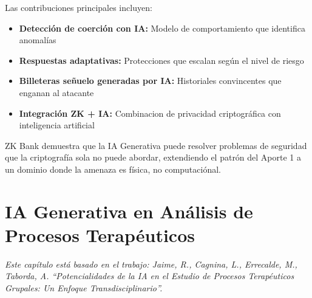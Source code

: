\documentclass[12pt,a4paper,twoside]{book}
\begin{document}
Las contribuciones principales incluyen:

\begin{itemize}
    \item \textbf{Detección de coerción con IA:} Modelo de comportamiento que identifica anomalías
    \item \textbf{Respuestas adaptativas:} Protecciones que escalan según el nivel de riesgo
    \item \textbf{Billeteras señuelo generadas por IA:} Historiales convincentes que enganan al atacante
    \item \textbf{Integración ZK + IA:} Combinacion de privacidad criptográfica con inteligencia artificial
\end{itemize}

ZK Bank demuestra que la IA Generativa puede resolver problemas de seguridad que la criptografía sola no puede abordar, extendiendo el patrón del Aporte 1 a un dominio donde la amenaza es física, no computaciónal.

\chapter{IA Generativa en Análisis de Procesos Terapéuticos}
\label{cap:clínico}

\begin{center}
\textit{Este capítulo está basado en el trabajo: Jaime, R., Cagnina, L., Errecalde, M., Taborda, A. ``Potencialidades de la IA en el Estudio de Procesos Terapéuticos Grupales: Un Enfoque Transdisciplinario''.}
\end{center}

\vspace{0.5cm}

\end{document}
